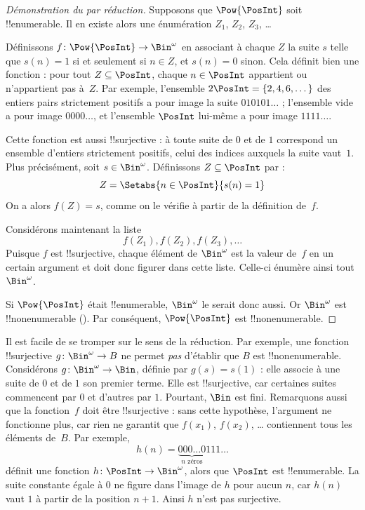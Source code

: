 \documentclass[../../../include/open-logic-section]{subfiles}
\begin{document}
\begin{proof}[Démonstration du {} par réduction]
Supposons que $\Pow{\PosInt}$ soit !!{enumerable}. Il en existe alors
une énumération $Z_{1}$, $Z_{2}$, $Z_{3}$, \dots

Définissons $f \colon \Pow{\PosInt} \to \Bin^\omega$ en associant
à chaque $Z$ la suite $s$ telle que $s(n) = 1$ si et seulement si
$n \in Z$, et $s(n) = 0$ sinon.
%
%
Cela définit bien une fonction : pour tout $Z \subseteq \PosInt$,
chaque $n \in \PosInt$ appartient ou n'appartient pas à~$Z$.
Par exemple, l'ensemble $2\PosInt = \{2, 4, 6, \dots\}$ des entiers
pairs strictement positifs a pour image la suite $010101\dots$ ;
l'ensemble vide a pour image $0000\dots$, et l'ensemble $\PosInt$
lui-même a pour image $1111\dots$.

Cette fonction est aussi !!{surjective} : à toute suite de $0$ et de
$1$ correspond un ensemble d'entiers strictement positifs, celui des
indices auxquels la suite vaut~$1$. Plus précisément, soit
$s \in \Bin^\omega$. Définissons $Z \subseteq \PosInt$ par :
\[
Z = \Setabs{n \in \PosInt}{s(n) = 1}
\]
On a alors $f(Z) = s$, comme on le vérifie à partir de la définition
de~$f$.

Considérons maintenant la liste
\[
f(Z_1), f(Z_2), f(Z_3), \dots
\]
Puisque $f$ est !!{surjective}, chaque élément de $\Bin^\omega$ est
la valeur de~$f$ en un certain argument et doit donc figurer dans
cette liste. Celle-ci énumère ainsi tout~$\Bin^\omega$.

Si $\Pow{\PosInt}$ était !!{enumerable}, $\Bin^\omega$ le serait
donc aussi. Or $\Bin^\omega$ est !!{nonenumerable}
(). Par conséquent,
$\Pow{\PosInt}$ est !!{nonenumerable}.
\end{proof}

\begin{explain}
Il est facile de se tromper sur le sens de la réduction. Par exemple,
une fonction !!{surjective} $g \colon \Bin^\omega \to B$ ne permet
\emph{pas} d'établir que $B$ est !!{nonenumerable}. Considérons
$g \colon \Bin^\omega \to \Bin$, définie par $g(s) = s(1)$ : elle
associe à une suite de $0$ et de $1$ son premier terme. Elle est
!!{surjective}, car certaines suites commencent par $0$ et d'autres
par $1$. Pourtant, $\Bin$ est fini. Remarquons aussi que la
fonction~$f$ doit être !!{surjective} : sans cette hypothèse,
l'argument ne fonctionne plus, car rien ne garantit que $f(x_1)$,
$f(x_2)$, \dots{} contiennent tous les éléments de~$B$. Par exemple,
\[
h(n) = \underbrace{000\dots0}_{\text{$n$ zéros}}111\dots
\]
définit une fonction $h\colon \PosInt \to \Bin^\omega$, alors que
$\PosInt$ est !!{enumerable}. La suite constante égale à $0$ ne
figure dans l’image de $h$ pour aucun $n$, car $h(n)$ vaut $1$
à partir de la position $n+1$. Ainsi $h$ n’est pas surjective.
%
%
\end{explain}
\end{document}
